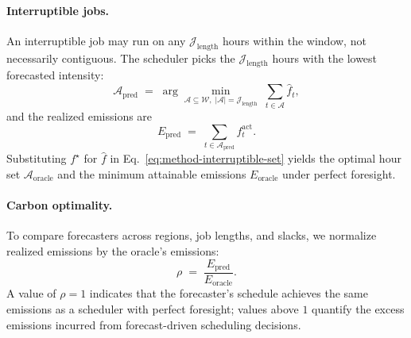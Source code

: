 \paragraph{Interruptible jobs.}
An interruptible job may run on any $\mathcal{J}_{\text{length}}$ hours within the window, not necessarily contiguous.
The scheduler picks the $\mathcal{J}_{\text{length}}$ hours with the lowest forecasted intensity:
\begin{equation}
    \mathcal{A}_{\text{pred}} \;=\; \arg\min_{\mathcal{A} \subseteq \mathcal{W},\; |\mathcal{A}| = \mathcal{J}_{\text{length}}} \; \sum_{t \in \mathcal{A}} \hat{f}_t,
    \label{eq:method-interruptible-set}
\end{equation}
and the realized emissions are
\begin{equation}
    E_{\text{pred}} \;=\; \sum_{t \in \mathcal{A}_{\text{pred}}} f^{\text{act}}_t.
    \label{eq:method-interruptible-emissions}
\end{equation}
Substituting $f^{\star}$ for $\hat{f}$ in Eq.~\ref{eq:method-interruptible-set} yields the optimal hour set $\mathcal{A}_{\text{oracle}}$ and the minimum attainable emissions $E_{\text{oracle}}$ under perfect foresight.

\paragraph{Carbon optimality.}
To compare forecasters across regions, job lengths, and slacks, we normalize realized emissions by the oracle's emissions:
\begin{equation}
    \rho \;=\; \frac{E_{\text{pred}}}{E_{\text{oracle}}}.
    \label{eq:method-rho}
\end{equation}
A value of $\rho = 1$ indicates that the forecaster's schedule achieves the same emissions as a scheduler with perfect foresight; values above $1$ quantify the excess emissions incurred from forecast-driven scheduling decisions.

